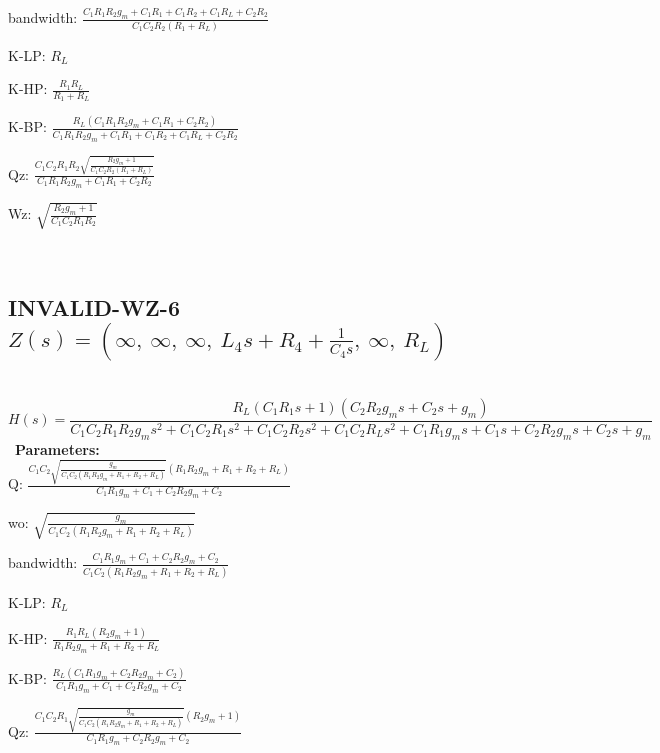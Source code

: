 \documentclass{article}
\begin{document}
bandwidth: $\frac{C_{1} R_{1} R_{2} g_{m} + C_{1} R_{1} + C_{1} R_{2} + C_{1} R_{L} + C_{2} R_{2}}{C_{1} C_{2} R_{2} \left(R_{1} + R_{L}\right)}$\ 

K-LP: $R_{L}$\ 

K-HP: $\frac{R_{1} R_{L}}{R_{1} + R_{L}}$\ 

K-BP: $\frac{R_{L} \left(C_{1} R_{1} R_{2} g_{m} + C_{1} R_{1} + C_{2} R_{2}\right)}{C_{1} R_{1} R_{2} g_{m} + C_{1} R_{1} + C_{1} R_{2} + C_{1} R_{L} + C_{2} R_{2}}$\ 

Qz: $\frac{C_{1} C_{2} R_{1} R_{2} \sqrt{\frac{R_{2} g_{m} + 1}{C_{1} C_{2} R_{2} \left(R_{1} + R_{L}\right)}}}{C_{1} R_{1} R_{2} g_{m} + C_{1} R_{1} + C_{2} R_{2}}$\ 

Wz: $\sqrt{\frac{R_{2} g_{m} + 1}{C_{1} C_{2} R_{1} R_{2}}}$\ 

\ 

\subsection{INVALID-WZ-6 $Z(s) = \left( \infty, \  \infty, \  \infty, \  L_{4} s + R_{4} + \frac{1}{C_{4} s}, \  \infty, \  R_{L}\right)$ } \ 
\textbf{\[H(s) = \frac{R_{L} \left(C_{1} R_{1} s + 1\right) \left(C_{2} R_{2} g_{m} s + C_{2} s + g_{m}\right)}{C_{1} C_{2} R_{1} R_{2} g_{m} s^{2} + C_{1} C_{2} R_{1} s^{2} + C_{1} C_{2} R_{2} s^{2} + C_{1} C_{2} R_{L} s^{2} + C_{1} R_{1} g_{m} s + C_{1} s + C_{2} R_{2} g_{m} s + C_{2} s + g_{m}}\] } \ 
\textbf{Parameters:}\\ 

Q: $\frac{C_{1} C_{2} \sqrt{\frac{g_{m}}{C_{1} C_{2} \left(R_{1} R_{2} g_{m} + R_{1} + R_{2} + R_{L}\right)}} \left(R_{1} R_{2} g_{m} + R_{1} + R_{2} + R_{L}\right)}{C_{1} R_{1} g_{m} + C_{1} + C_{2} R_{2} g_{m} + C_{2}}$\ 

wo: $\sqrt{\frac{g_{m}}{C_{1} C_{2} \left(R_{1} R_{2} g_{m} + R_{1} + R_{2} + R_{L}\right)}}$\ 

bandwidth: $\frac{C_{1} R_{1} g_{m} + C_{1} + C_{2} R_{2} g_{m} + C_{2}}{C_{1} C_{2} \left(R_{1} R_{2} g_{m} + R_{1} + R_{2} + R_{L}\right)}$\ 

K-LP: $R_{L}$\ 

K-HP: $\frac{R_{1} R_{L} \left(R_{2} g_{m} + 1\right)}{R_{1} R_{2} g_{m} + R_{1} + R_{2} + R_{L}}$\ 

K-BP: $\frac{R_{L} \left(C_{1} R_{1} g_{m} + C_{2} R_{2} g_{m} + C_{2}\right)}{C_{1} R_{1} g_{m} + C_{1} + C_{2} R_{2} g_{m} + C_{2}}$\ 

Qz: $\frac{C_{1} C_{2} R_{1} \sqrt{\frac{g_{m}}{C_{1} C_{2} \left(R_{1} R_{2} g_{m} + R_{1} + R_{2} + R_{L}\right)}} \left(R_{2} g_{m} + 1\right)}{C_{1} R_{1} g_{m} + C_{2} R_{2} g_{m} + C_{2}}$\ 
\end{document}
